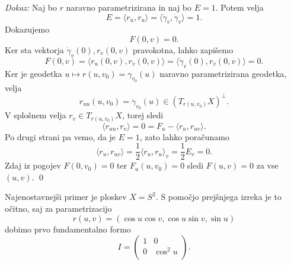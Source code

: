 \noindent
{\em Dokaz:\/}
Naj bo $r$ naravno parametrizirana in naj bo $E = 1$. Potem velja \begin{equation*}
E = \langle r_u, r_u \rangle = \langle \dot{\gamma}_v, \dot{\gamma}_v \rangle = 1. 
\end{equation*}
Dokazujemo \begin{equation*}
F(0, v) = 0.
\end{equation*}
Ker sta vektorja $\dot{\gamma}_v (0), r_v (0, v)$ pravokotna, lahko zapišemo  
\begin{equation*}
F(0, v ) = \langle r_u(0, v), r_v(0, v) \rangle = \langle \dot{\gamma}_v (0), r_v (0, v) \rangle =  0. 
\end{equation*}  
Ker je geodetka $u \mapsto r(u, v_0) = \gamma_{v_0}(u)$ naravno parametrizirana geodetka, velja \begin{equation*}
r_{uu}(u, v_0) = \ddot{\gamma}_{v_0}(u) \in (T_{r(u, v_0)}X)^{\perp}.
\end{equation*}  
V splošnem velja $r_v \in  T_{r(u, v_0)}X$, torej sledi \begin{equation*}
\langle r_{uu}, r_v \rangle = 0 = F_u - \langle r_u, r_{uv} \rangle . 
\end{equation*}  
Po drugi strani pa vemo, da je $E = 1$, zato lahko poračunamo \begin{equation*}
\langle r_u, r_{uv} \rangle =  \frac{1}{2} \langle r_u, r_u \rangle_v = \frac{1}{2} E_v = 0.   
\end{equation*}  
Zdaj iz pogojev $F(0, v_0) = 0$ ter $F_u(u, v_0) = 0$ sledi $F(u,v) = 0$ za vse $(u,v)$. 
\qed

\begin{primer}
Najenostavnejši primer je ploskev $X = S^2$. S pomočjo prejšnjega izreka je to očitno, saj za parametrizacijo \begin{equation*}
r(u, v) = (\cos u \cos v, \cos u \sin v, \sin u)
\end{equation*}dobimo prvo fundamentalno formo \begin{equation*}
I = \begin{pmatrix}
    1 & 0\\
    0 & \cos^2 u\\
\end{pmatrix}.
\end{equation*}  
\end{primer}

